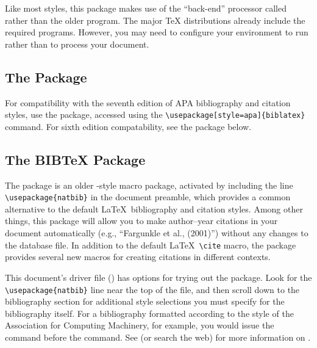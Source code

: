 Like most \BibLaTeX{} styles, this package makes use of the
``back-end'' processor called  rather than the
older  program. The major \TeX{} distributions already
include the required programs. However, you may need to configure your
environment to run  rather than  to process
your document.

\subsection{The  Package}
For compatibility with the seventh edition of APA bibliography and
citation styles, use the  package, accessed using
the \verb|\usepackage[style=apa]{biblatex}| command. For sixth edition
compatability, see the  package below.

\subsection{The  B{\small IB}\TeX{} Package}
The  package is an older \BibTeX-style macro package,
activated by including the line \verb|\usepackage{natbib}| in the
document preamble, which provides a common alternative to the
default \LaTeX\ bibliography and citation styles.  Among other things,
this package will allow you to make author--year citations in your
document automatically (e.g., ``Fargunkle et al., (2001)'') without
any changes to the \BibTeX{} database file.  In addition to the
default \LaTeX\ \verb|\cite| macro, the package provides several new
macros for creating citations in different contexts.

This document's driver file () has options for trying
out the  package.  Look for the \verb|\usepackage{natbib}|
line near the top of the file, and then scroll down to the
bibliography section for additional style selections you must specify
for the bibliography itself.  For a bibliography formatted according
to the style of the Association for Computing Machinery, for example,
you would issue the command \verb|| before
the \verb|| command.  See \cite{Kopka:2004:GLT} (or
search the web) for more information on .

